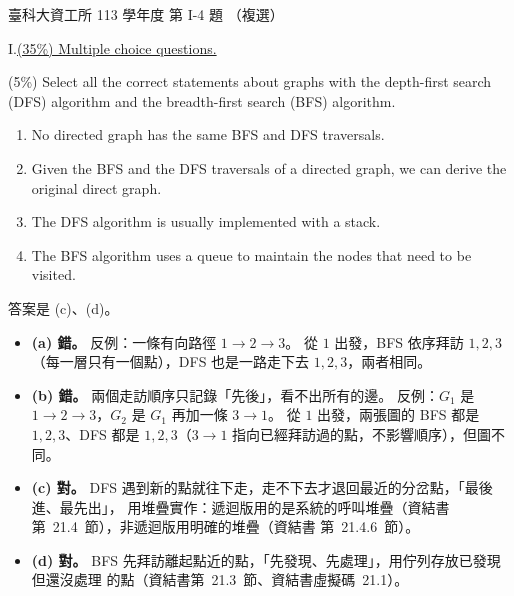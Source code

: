 \begin{pastexam}[label={px:ntust-113-ice-04}]{臺科大資工所 113 學年度 第 I-4 題}
（複選）

I.\quad \underline{(35\%) Multiple choice questions.}

(5\%) Select all the correct statements about graphs with the depth-first search (DFS) algorithm and
the breadth-first search (BFS) algorithm.
\begin{enumerate}[label=(\alph*)]
\item No directed graph has the same BFS and DFS traversals.
\item Given the BFS and the DFS traversals of a directed graph, we can derive the original direct
graph.
\item The DFS algorithm is usually implemented with a stack.
\item The BFS algorithm uses a queue to maintain the nodes that need to be visited.
\end{enumerate}
\end{pastexam}

\begin{pastsoln}
答案是 (c)、(d)。

\begin{itemize}
\item \textbf{(a) 錯。} 反例：一條有向路徑 $1 \to 2 \to 3$。 從 $1$ 出發，BFS 依序拜訪
$1, 2, 3$（每一層只有一個點），DFS 也是一路走下去 $1, 2, 3$，兩者相同。
\item \textbf{(b) 錯。} 兩個走訪順序只記錄「先後」，看不出所有的邊。 反例：$G_1$ 是
$1 \to 2 \to 3$，$G_2$ 是 $G_1$ 再加一條 $3 \to 1$。 從 $1$ 出發，兩張圖的 BFS 都是 $1, 2, 3$、DFS
都是 $1, 2, 3$（$3 \to 1$ 指向已經拜訪過的點，不影響順序），但圖不同。
\item \textbf{(c) 對。} DFS 遇到新的點就往下走，走不下去才退回最近的分岔點，「最後進、最先出」，
用堆疊實作：遞迴版用的是系統的呼叫堆疊（資結書第~21.4~節），非遞迴版用明確的堆疊（資結書
第~21.4.6~節）。
\item \textbf{(d) 對。} BFS 先拜訪離起點近的點，「先發現、先處理」，用佇列存放已發現但還沒處理
的點（資結書第~21.3~節、資結書虛擬碼~21.1）。
\end{itemize}
\end{pastsoln}
